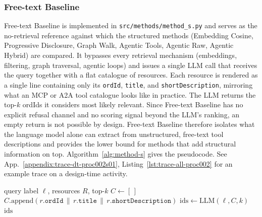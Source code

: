 \subsubsection{Free-text Baseline}
\label{appendix:method-s}

Free-text Baseline is implemented in \texttt{src/methods/method\_s.py} and serves as the no-retrieval reference against which the structured methods (Embedding Cosine, Progressive Disclosure, Graph Walk, Agentic Tools, Agentic Raw, Agentic Hybrid) are compared. It bypasses every retrieval mechanism (embeddings, filtering, graph traversal, agentic loops) and issues a single LLM call that receives the query together with a flat catalogue of resources. Each resource is rendered as a single line containing only its \texttt{ordId}, \texttt{title}, and \texttt{shortDescription}, mirroring what an MCP or A2A tool catalogue looks like in practice. The LLM returns the top-$k$ ordIds it considers most likely relevant. Since Free-text Baseline has no explicit refusal channel and no scoring signal beyond the LLM's ranking, an empty return is not possible by design. Free-text Baseline therefore isolates what the language model alone can extract from unstructured, free-text tool descriptions and provides the lower bound for methods that add structural information on top. Algorithm~\ref{alg:method-s} gives the pseudocode. See App.~\ref{appendix:trace-dt-proc002s01}, Listing~\ref{lst:trace-all-proc002} for an example trace on a design-time activity.

\begin{algorithm}[!t]\small
\caption{Free-text Baseline (\texttt{src/methods/method\_s.py})}
\label{alg:method-s}
\begin{algorithmic}[1]
\REQUIRE query label $\ell$, resources $R$, top-$k$
\STATE $C \leftarrow [\,]$
  \STATE $C.\text{append}(r.\texttt{ordId} \,\|\, r.\texttt{title} \,\|\, r.\texttt{shortDescription})$
\ENDFOR
\STATE $\text{ids} \leftarrow \mathrm{LLM}(\ell, C, k)$ 
\RETURN $\text{ids}$
\end{algorithmic}
\end{algorithm}


